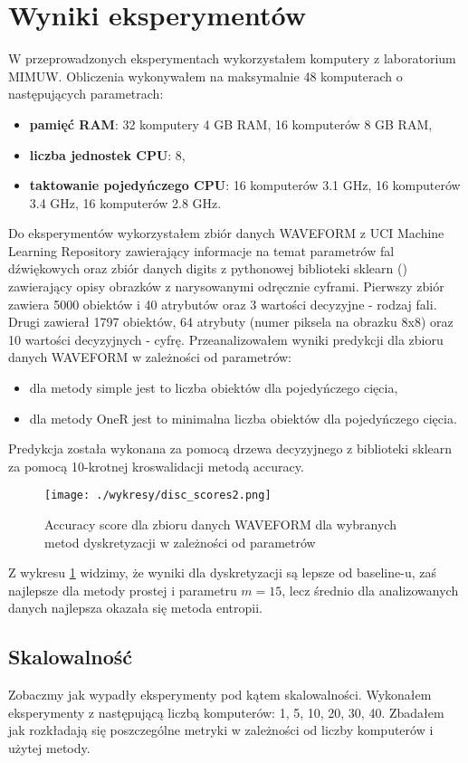 \documentclass[magisterska]{pracamgr}
\theoremstyle{plain}
\theoremstyle{definition}
\theoremstyle{remark}
\begin{document}
\section{Wyniki eksperymentów}
W przeprowadzonych eksperymentach wykorzystałem komputery z laboratorium MIMUW. Obliczenia wykonywałem 
na maksymalnie 48 komputerach o następujących parametrach:
  \begin{itemize}
   \item \textbf{pamięć RAM}: 32 komputery 4 GB RAM, 16 komputerów 8 GB RAM,
   \item \textbf{liczba jednostek CPU}: 8,
   \item \textbf{taktowanie pojedyńczego CPU}: 16 komputerów 3.1 GHz, 16 komputerów 3.4 GHz, 16 komputerów 2.8 GHz.
  \end{itemize}
Do eksperymentów wykorzystałem zbiór danych WAVEFORM z UCI Machine Learning Repository 
zawierający informacje na temat parametrów fal dźwiękowych oraz zbiór danych digits z pythonowej biblioteki sklearn (\cite{SklearnDocumentation})
zawierający opisy obrazków z narysowanymi odręcznie cyframi.
Pierwszy zbiór zawiera 5000 obiektów i 40 atrybutów oraz 3 wartości decyzyjne - rodzaj fali.
Drugi zawierał 1797 obiektów, 64 atrybuty (numer piksela na obrazku 8x8) oraz 10 wartości decyzyjnych - cyfrę.
Przeanalizowałem wyniki predykcji dla zbioru danych WAVEFORM w zależności od parametrów:
  \begin{itemize}
   \item dla metody simple jest to liczba obiektów dla pojedyńczego cięcia,
   \item dla metody OneR jest to minimalna liczba obiektów dla pojedyńczego cięcia.
  \end{itemize}

Predykcja została wykonana za pomocą drzewa decyzyjnego z biblioteki sklearn za pomocą 10-krotnej
kroswalidacji metodą accuracy.

\begin{figure}
 \caption{Accuracy score dla zbioru danych WAVEFORM dla wybranych metod dyskretyzacji w zależności od parametrów}\label{fig:disc_scores}
 \centering\texttt{[image: ./wykresy/disc\_scores2.png]}
\end{figure}

Z wykresu \ref{fig:disc_scores} widzimy, że wyniki dla dyskretyzacji są lepsze od baseline-u, 
zaś najlepsze dla metody prostej i parametru $m = 15$, lecz 
średnio dla analizowanych danych najlepsza okazała się metoda entropii.
\subsection{Skalowalność}
Zobaczmy jak wypadły eksperymenty pod kątem skalowalności. Wykonałem eksperymenty z następującą liczbą komputerów: 1, 5, 10, 20, 30, 40.
Zbadałem jak rozkładają się poszczególne metryki w zależności od liczby komputerów i użytej metody.
\end{document}
